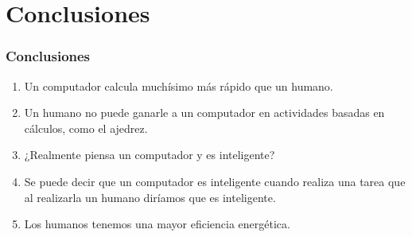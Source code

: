 \documentclass[a4paper,t,xcolor=pst,dvips,colortheme]{beamer}
\begin{document}
\section{Conclusiones}

\begin{frame}[c]
    \frametitle{Conclusiones}
    \begin{enumerate}[<+->]
        \item Un computador calcula muchísimo más rápido que un humano.
        \item Un humano no puede ganarle a un computador en actividades basadas en cálculos, como el ajedrez.
        \item ¿Realmente piensa un computador y es inteligente?
        \item Se puede decir que un computador es inteligente cuando realiza una tarea que al realizarla un humano diríamos que es inteligente.
        \item Los humanos tenemos una mayor eficiencia energética.
    \end{enumerate}
\end{frame}
\end{document}
